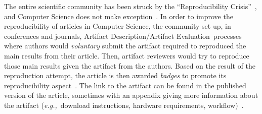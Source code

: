 \documentclass[sigconf,natbib=false]{acmart}
\newcommand{\eg}{\emph{e.g.,}}
\newcommand{\ad}{Artifact Description}
\newcommand{\aeval}{Artifact Evaluation}
\newcommand{\adae}{\ad/\aeval}
\newcommand{\todo}[1]{{\color{red}{TODO: #1}}}
\begin{document}
% 

The entire scientific community has been struck by the ``Reproducibility Crisis''~\cite{baker500ScientistsLift2016}, and Computer Science does not make exception~\cite{collberg_repeatability_2015}.
In order to improve the reproducibility of articles in Computer Science, the community set up, in conferences and journals, \adae\ processes~\cite{kidwell2016badges} where authors would \emph{voluntary} submit the artifact required to reproduced the main results from their article.
Then, artifact reviewers would try to reproduce those main results given the artifact from the authors.
Based on the result of the reproduction attempt, the article is then awarded \emph{badges} to promote its reproducibility aspect~\cite{acm-badges}.
The link to the artifact can be found in the published version of the article, sometimes with an appendix giving more information about the artifact (\eg\ download instructions, hardware requirements, workflow)~\cite{paperswithcode, kang2023papers, hong2013software}.
\end{document}
